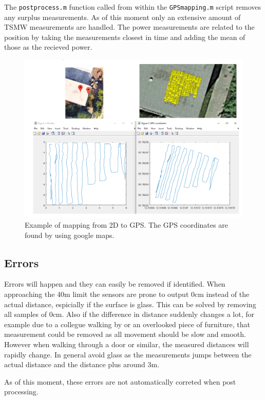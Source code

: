 \documentclass[a4paper,twoside, 12pt]{article}
\begin{document}
The \texttt{postprocess.m} function called from within the \texttt{GPSmapping.m} script removes any surplus measurements. As of this moment only an extensive amount of TSMW measurements are handled. The power measurements are related to the position by taking the measurements closest in time and adding the mean of those as the recieved power.

\begin{figure}[ht]
\centering
\includegraphics[width=\textwidth]{plotexample.png}
\caption{Example of mapping from 2D to GPS. The GPS coordinates are found by using google maps.}
\label{fig:map}
\end{figure}


\subsection{Errors}
Errors will happen and they can easily be removed if identified. When approaching the 40m limit the sensors are prone to output 0cm instead of the actual distance, espicially if the surface is glass. This can be solved by removing all samples of 0cm. Also if the difference in distance suddenly changes a lot, for example due to a collegue walking by or an overlooked piece of furniture, that measurement could be removed as all movement should be slow and smooth. However when walking through a door or similar, the measured distances will rapidly change. In general avoid glass as the measurements jumps between the actual distance and the distance plus around 3m.

As of this moment, these errors are not automatically correted when post processing.
\end{document}
